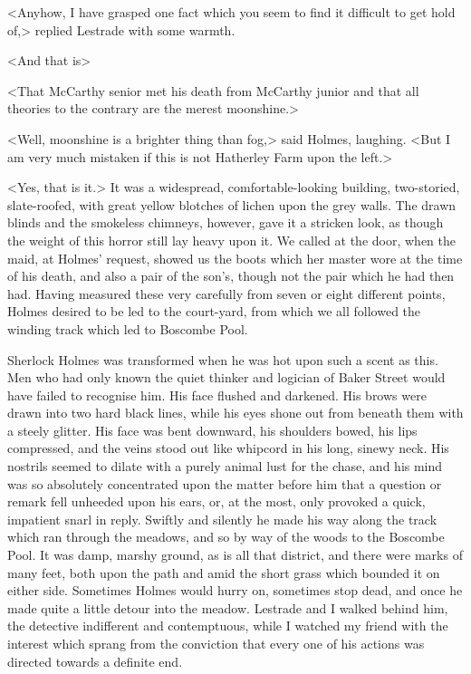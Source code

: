 <Anyhow, I have grasped one fact which you seem to find it difficult to get hold of,> replied Lestrade with some warmth.

<And that is\longdash>

<That McCarthy senior met his death from McCarthy junior and that all theories to the contrary are the merest moonshine.>

<Well, moonshine is a brighter thing than fog,> said Holmes, laughing. <But I am very much mistaken if this is not Hatherley Farm upon the left.>

<Yes, that is it.> It was a widespread, comfortable-looking building, two-storied, slate-roofed, with great yellow blotches of lichen upon the grey walls. The drawn blinds and the smokeless chimneys, however, gave it a stricken look, as though the weight of this horror still lay heavy upon it. We called at the door, when the maid, at Holmes' request, showed us the boots which her master wore at the time of his death, and also a pair of the son's, though not the pair which he had then had. Having measured these very carefully from seven or eight different points, Holmes desired to be led to the court-yard, from which we all followed the winding track which led to Boscombe Pool.

Sherlock Holmes was transformed when he was hot upon such a scent as this. Men who had only known the quiet thinker and logician of Baker Street would have failed to recognise him. His face flushed and darkened. His brows were drawn into two hard black lines, while his eyes shone out from beneath them with a steely glitter. His face was bent downward, his shoulders bowed, his lips compressed, and the veins stood out like whipcord in his long, sinewy neck. His nostrils seemed to dilate with a purely animal lust for the chase, and his mind was so absolutely concentrated upon the matter before him that a question or remark fell unheeded upon his ears, or, at the most, only provoked a quick, impatient snarl in reply. Swiftly and silently he made his way along the track which ran through the meadows, and so by way of the woods to the Boscombe Pool. It was damp, marshy ground, as is all that district, and there were marks of many feet, both upon the path and amid the short grass which bounded it on either side. Sometimes Holmes would hurry on, sometimes stop dead, and once he made quite a little detour into the meadow. Lestrade and I walked behind him, the detective indifferent and contemptuous, while I watched my friend with the interest which sprang from the conviction that every one of his actions was directed towards a definite end.

